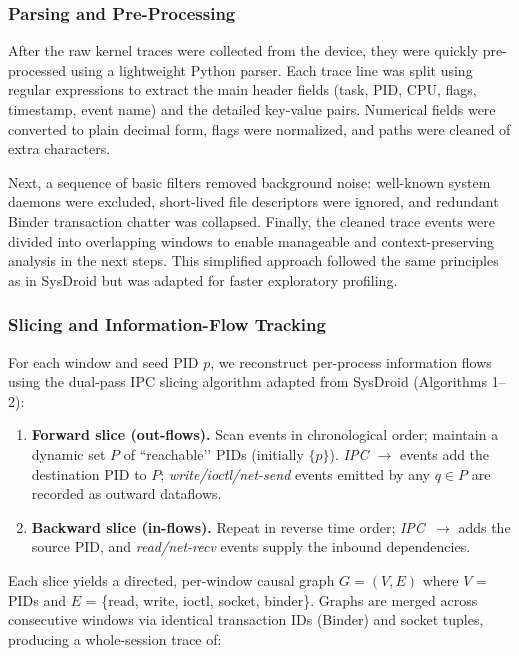 \documentclass[a4paper,12pt]{report}
\begin{document}
\subsubsection{Parsing and Pre-Processing}
After the raw kernel traces were collected from the device, they were quickly pre-processed using a lightweight Python parser. Each trace line was split using regular expressions to extract the main header fields (task, PID, CPU, flags, timestamp, event name) and the detailed key-value pairs. Numerical fields were converted to plain decimal form, flags were normalized, and paths were cleaned of extra characters.

Next, a sequence of basic filters removed background noise: well-known system daemons were excluded, short-lived file descriptors were ignored, and redundant Binder transaction chatter was collapsed. Finally, the cleaned trace events were divided into overlapping windows to enable manageable and context-preserving analysis in the next steps. This simplified approach followed the same principles as in SysDroid but was adapted for faster exploratory profiling.

\subsubsection{Slicing and Information-Flow Tracking}

For each window and seed PID $p$, we reconstruct per-process
information flows using the dual-pass IPC slicing algorithm adapted
from SysDroid (Algorithms 1–2):

\begin{enumerate}
  \item \textbf{Forward slice (out-flows).}
        Scan events in chronological order; maintain a dynamic set
        $P$ of “reachable’’ PIDs (initially $\{p\}$).
        \emph{IPC $\rightarrow$} events add the destination PID to $P$;
        \emph{write/ioctl/net-send} events emitted by any
        $q\!\in\!P$ are recorded as outward dataflows.
  \item \textbf{Backward slice (in-flows).}
        Repeat in reverse time order; \emph{IPC~$\rightarrow$} adds
        the source PID, and \emph{read/net-recv} events supply the
        inbound dependencies.
\end{enumerate}

Each slice yields a directed, per-window causal graph
$G=(V,E)$ where
$V$ = PIDs and $E$ = \{read, write, ioctl, socket, binder\}.
Graphs are merged across consecutive windows via identical
transaction IDs (Binder) and socket tuples, producing a
whole-session trace of:
\end{document}
